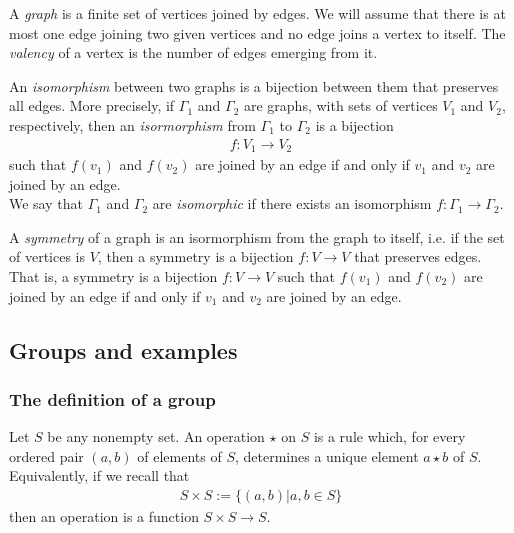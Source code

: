 \documentclass{article}
\begin{document}
\begin{definition}
    A \emph{graph} is a finite set of vertices joined by edges. We will
    assume that there is at most one edge joining two given vertices and
    no edge joins a vertex to itself. The \emph{valency} of a vertex
    is the number of edges emerging from it.
\end{definition}

\setcounter{theorem}{2}
\begin{definition}
    An \emph{isomorphism} between two graphs is a bijection between them
    that preserves all edges. More precisely, if $\Gamma_1$ and $\Gamma_2$
    are graphs, with sets of vertices $V_1$ and $V_2$, respectively, then
    an \emph{isormorphism} from $\Gamma_1$ to $\Gamma_2$ is a bijection
    \begin{align*}
        f:V_1\to V_2
    \end{align*}
    such that $f(v_1)$ and $f(v_2)$ are joined by an edge if and only if
    $v_1$ and $v_2$ are joined by an edge.\\
    We say that $\Gamma_1$ and $\Gamma_2$ are \emph{isomorphic} if there
    exists an isomorphism $f:\Gamma_1\to \Gamma_2$.
\end{definition}

\setcounter{theorem}{8}
\begin{definition}
    A \emph{symmetry} of a graph is an isormorphism from the graph to
    itself, i.e. if the set of vertices is $V$, then a symmetry is a
    bijection $f:V\to V$ that preserves edges. That is, a symmetry is
    a bijection $f:V\to V$ such that $f(v_1)$ and $f(v_2)$ are joined
    by an edge if and only if $v_1$ and $v_2$ are joined by an edge.
\end{definition}

\subsection{Groups and examples}

\subsubsection{The definition of a group}

\begin{definition}
    Let $S$ be any nonempty set. An operation $\star$ on $S$ is a rule
    which, for every ordered pair $(a,b)$ of elements of $S$, determines
    a unique element $a\star b$ of $S$. Equivalently, if we recall that
    \begin{align*}
        S\times S := \{(a,b) | a,b\in S\}
    \end{align*}
    then an operation is a function $S\times S\to S$.
\end{definition}
\end{document}
